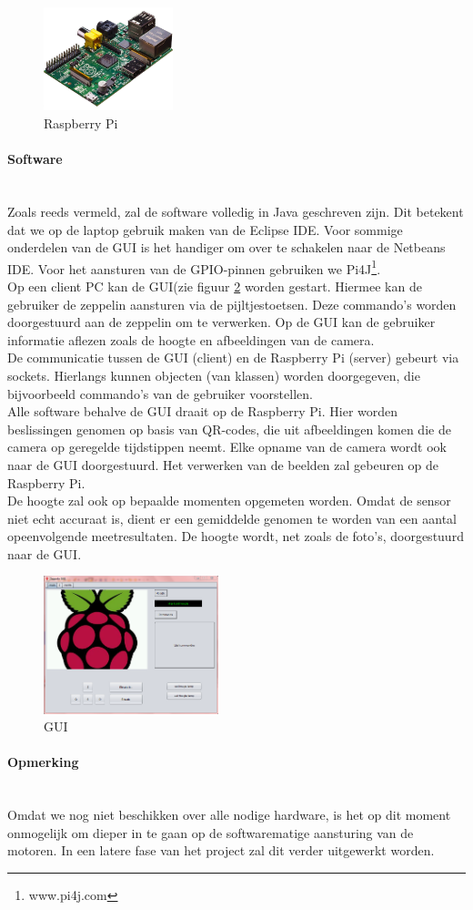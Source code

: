 \documentclass{peno-opdracht2}
\begin{document}
\begin{figure}[ht!]
\centering
\includegraphics[height=30mm]{raspb.jpg}
\caption{Raspberry Pi}
\label{Pi}
\end{figure}

\paragraph{Software} ~\\
Zoals reeds vermeld, zal de software volledig in Java geschreven zijn. Dit betekent dat we op de laptop gebruik maken van de Eclipse IDE. Voor sommige onderdelen van de GUI is het handiger om over te schakelen naar de Netbeans IDE. Voor het aansturen van de GPIO-pinnen gebruiken we Pi4J\footnote{www.pi4j.com}.\\

Op een client PC kan de GUI(zie figuur \ref{GUI} worden gestart. Hiermee kan de gebruiker de zeppelin aansturen via de pijltjestoetsen. Deze commando's worden doorgestuurd aan de zeppelin om te verwerken. Op de GUI kan de gebruiker informatie aflezen zoals de hoogte en afbeeldingen van de camera. \\

De communicatie tussen de GUI (client) en de Raspberry Pi (server) gebeurt via sockets. Hierlangs kunnen objecten (van klassen) worden doorgegeven, die bijvoorbeeld commando's van de gebruiker voorstellen.\\

Alle software behalve de GUI draait op de Raspberry Pi. Hier worden beslissingen genomen op basis van QR-codes, die uit afbeeldingen komen die de camera op geregelde tijdstippen neemt. Elke opname van de camera wordt ook naar de GUI doorgestuurd. Het verwerken van de beelden zal gebeuren op de Raspberry Pi.\\

De hoogte zal ook op bepaalde momenten opgemeten worden. Omdat de sensor niet echt accuraat is, dient er een gemiddelde genomen te worden van een aantal opeenvolgende meetresultaten. De hoogte wordt, net zoals de foto's, doorgestuurd naar de GUI.

\begin{figure}[ht!]
\centering
\includegraphics[height=40mm]{GUI.png}
\caption{GUI}
\label{GUI}
\end{figure}


\paragraph{Opmerking} ~\\
Omdat we nog niet beschikken over alle nodige hardware, is het op dit moment onmogelijk om dieper in te gaan op de softwarematige aansturing van de motoren. In een latere fase van het project zal dit verder uitgewerkt worden.
\end{document}

